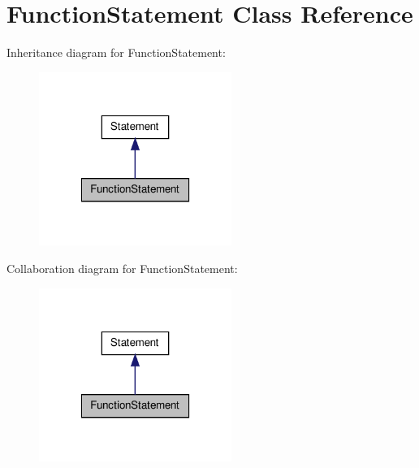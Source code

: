 \hypertarget{class_function_statement}{\section{Function\-Statement Class Reference}
\label{class_function_statement}
}


Inheritance diagram for Function\-Statement\-:
\nopagebreak
\begin{figure}[H]
\begin{center}
\leavevmode
\includegraphics[width=178pt]{class_function_statement__inherit__graph}
\end{center}
\end{figure}


Collaboration diagram for Function\-Statement\-:
\nopagebreak
\begin{figure}[H]
\begin{center}
\leavevmode
\includegraphics[width=178pt]{class_function_statement__coll__graph}
\end{center}
\end{figure}
